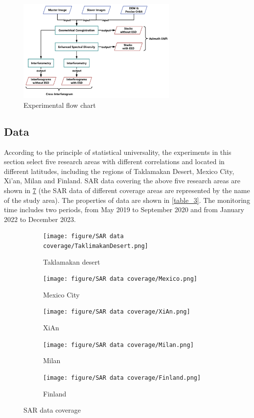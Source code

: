 \documentclass[a4paper,fleqn]{cas-sc}
\begin{document}
\begin{figure}
	\centering 
	\includegraphics[width=0.7\textwidth]{figure/Experimental flow chart.png}	
	\caption{Experimental flow chart} 
	\label{fig_3}%
\end{figure}

\subsection{Data}

According to the principle of statistical universality, the experiments in this section select five research areas with different correlations and located in different latitudes, including the regions of Taklamakan Desert, Mexico City, Xi’an, Milan and Finland. SAR data covering the above five research areas are shown in \ref{fig_4} (the SAR data of different coverage areas are represented by the name of the study area). The properties of data are shown in \ref{table_3}. The monitoring time includes two periods, from May 2019 to September 2020 and from January 2022 to December 2023. \par

\begin{figure}
    \centering
    \begin{subfigure}{0.32\textwidth}
        \centering
        \texttt{[image: figure/SAR data coverage/TaklimakanDesert.png]}
        \caption{Taklamakan desert}
        \label{fig_4a}
    \end{subfigure}%
    \begin{subfigure}{0.32\textwidth}
        \centering
        \texttt{[image: figure/SAR data coverage/Mexico.png]}
        \caption{Mexico City}
        \label{fig_4b}
    \end{subfigure}
    \begin{subfigure}{0.32\textwidth}
        \centering
        \texttt{[image: figure/SAR data coverage/XiAn.png]}
        \caption{XiAn}
        \label{fig_4c}
    \end{subfigure}
    \medskip
    \begin{subfigure}{0.32\textwidth}
        \centering
        \texttt{[image: figure/SAR data coverage/Milan.png]}
        \caption{Milan}
        \label{fig_4d}
    \end{subfigure}%
    \begin{subfigure}{0.32\textwidth}
        \centering
        \texttt{[image: figure/SAR data coverage/Finland.png]}
        \caption{Finland}
        \label{fig_4e}
    \end{subfigure}
    \caption{SAR data coverage}
    \label{fig_4}
\end{figure}
\end{document}
